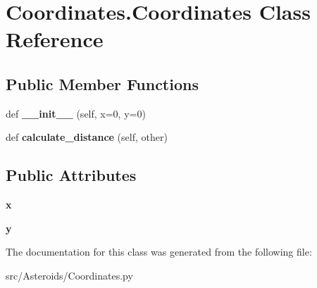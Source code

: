 \hypertarget{classCoordinates_1_1Coordinates}{}\section{Coordinates.\+Coordinates Class Reference}
\label{classCoordinates_1_1Coordinates}
\subsection*{Public Member Functions}
\begin{DoxyCompactItemize}
\item 
def {\bfseries \+\_\+\+\_\+init\+\_\+\+\_\+} (self, x=0, y=0)\hypertarget{classCoordinates_1_1Coordinates_a5ac43924c43e9785be8589b8a8332da2}{}\label{classCoordinates_1_1Coordinates_a5ac43924c43e9785be8589b8a8332da2}

\item 
def {\bfseries calculate\+\_\+distance} (self, other)\hypertarget{classCoordinates_1_1Coordinates_a9a095550405cda8a1ddeaf52c92132c8}{}\label{classCoordinates_1_1Coordinates_a9a095550405cda8a1ddeaf52c92132c8}

\end{DoxyCompactItemize}
\subsection*{Public Attributes}
\begin{DoxyCompactItemize}
\item 
{\bfseries x}\hypertarget{classCoordinates_1_1Coordinates_a3aba78cfc8f0666027e7573edc372b7c}{}\label{classCoordinates_1_1Coordinates_a3aba78cfc8f0666027e7573edc372b7c}

\item 
{\bfseries y}\hypertarget{classCoordinates_1_1Coordinates_a4f539bd171f295556d6cbd8224d66019}{}\label{classCoordinates_1_1Coordinates_a4f539bd171f295556d6cbd8224d66019}

\end{DoxyCompactItemize}


The documentation for this class was generated from the following file\+:\begin{DoxyCompactItemize}
\item 
src/\+Asteroids/Coordinates.\+py\end{DoxyCompactItemize}
